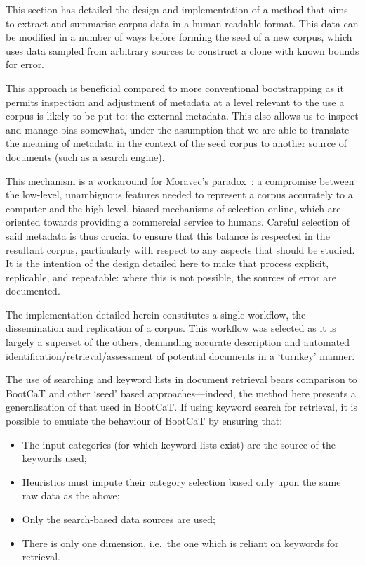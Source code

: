 

This section has detailed the design and implementation of a method that aims to extract and summarise corpus data in a human readable format.  This data can be modified in a number of ways before forming the seed of a new corpus, which uses data sampled from arbitrary sources to construct a clone with known bounds for error.

This approach is beneficial compared to more conventional bootstrapping as it permits inspection and adjustment of metadata at a level relevant to the use a corpus is likely to be put to: the external metadata.  This also allows us to inspect and manage bias somewhat, under the assumption that we are able to translate the meaning of metadata in the context of the seed corpus to another source of documents (such as a search engine).

This mechanism is a workaround for Moravec's paradox~\cite{moravec1988mind}: a compromise between the low-level, unambiguous features needed to represent a corpus accurately to a computer and the high-level, biased mechanisms of selection online, which are oriented towards providing a commercial service to humans.  Careful selection of said metadata is thus crucial to ensure that this balance is respected in the resultant corpus, particularly with respect to any aspects that should be studied.  It is the intention of the design detailed here to make that process explicit, replicable, and repeatable: where this is not possible, the sources of error are documented.

The implementation detailed herein constitutes a single workflow, the dissemination and replication of a corpus.  This workflow was selected as it is largely a superset of the others, demanding accurate description and automated identification/retrieval/assessment of potential documents in a `turnkey' manner.




The use of searching and keyword lists in document retrieval bears comparison to BootCaT and other `seed' based approaches---indeed, the method here presents a generalisation of that used in BootCaT.  If using keyword search for retrieval, it is possible to emulate the behaviour of BootCaT by ensuring that:

\begin{itemize}
    \item The input categories (for which keyword lists exist) are the source of the keywords used;
    \item Heuristics must impute their category selection based only upon the same raw data as the above;
    \item Only the search-based data sources are used;
    \item There is only one dimension, i.e.\ the one which is reliant on keywords for retrieval.
\end{itemize}

